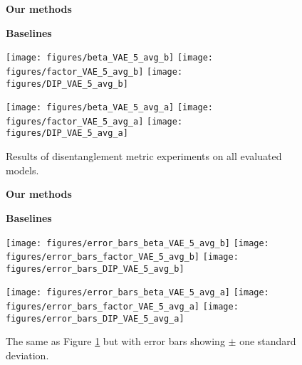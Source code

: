 \begin{figure}
	\begin{minipage}{0.5\columnwidth}
	\begin{center}
		\textbf{Our methods}
	\end{center}
\end{minipage}%
\begin{minipage}{0.5\columnwidth}
	\begin{center}
		\textbf{Baselines}
	\end{center}
\end{minipage}
\begin{minipage}{0.5\columnwidth}	
	\texttt{[image: figures/beta\_VAE\_5\_avg\_b]}
	\texttt{[image: figures/factor\_VAE\_5\_avg\_b]}
	\texttt{[image: figures/DIP\_VAE\_5\_avg\_b]}
\end{minipage}%
\begin{minipage}{0.5\columnwidth}
	\texttt{[image: figures/beta\_VAE\_5\_avg\_a]}
	\texttt{[image: figures/factor\_VAE\_5\_avg\_a]}
	\texttt{[image: figures/DIP\_VAE\_5\_avg\_a]}	
\end{minipage}
\caption{\label{fig:all_disentanglement} Results of disentanglement metric experiments on all evaluated models.}
\end{figure}


\begin{figure}
	\begin{minipage}{0.5\columnwidth}
		\begin{center}
			\textbf{Our methods}
		\end{center}
	\end{minipage}%
	\begin{minipage}{0.5\columnwidth}
		\begin{center}
			\textbf{Baselines}
		\end{center}
	\end{minipage}
	\begin{minipage}{0.5\columnwidth}	
		\texttt{[image: figures/error\_bars\_beta\_VAE\_5\_avg\_b]}
		\texttt{[image: figures/error\_bars\_factor\_VAE\_5\_avg\_b]}
		\texttt{[image: figures/error\_bars\_DIP\_VAE\_5\_avg\_b]}
	\end{minipage}%
	\begin{minipage}{0.5\columnwidth}
		\texttt{[image: figures/error\_bars\_beta\_VAE\_5\_avg\_a]}
		\texttt{[image: figures/error\_bars\_factor\_VAE\_5\_avg\_a]}
		\texttt{[image: figures/error\_bars\_DIP\_VAE\_5\_avg\_a]}	
	\end{minipage}
	\caption{\label{fig:all_disentanglement_error_bars} The same as Figure \ref{fig:all_disentanglement} but with error bars showing $\pm$ one standard deviation.}
\end{figure}

